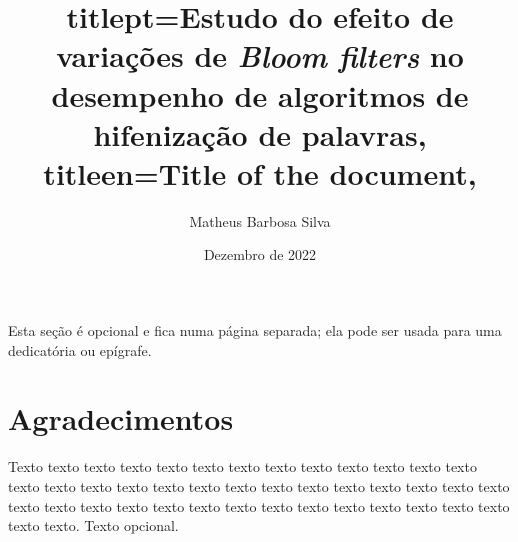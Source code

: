 \documentclass[12pt,twoside,english,brazilian]{book}
\title{
    titlept={Estudo do efeito de variações de \textit{Bloom filters} no desempenho de algoritmos de hifenização de palavras},
    titleen={Title of the document},
}
\author{Matheus Barbosa Silva}
\date{Dezembro de 2022}
\begin{document}

\frontmatter

\pagestyle{plain}

\onehalfspacing %

\maketitle %


\begin{dedicatoria}
Esta seção é opcional e fica numa página separada; ela pode ser usada para
uma dedicatória ou epígrafe.
\end{dedicatoria}


\chapter*{Agradecimentos}

Texto texto texto texto texto texto texto texto texto texto texto texto texto
texto texto texto texto texto texto texto texto texto texto texto texto texto
texto texto texto texto texto texto texto texto texto texto texto texto texto
texto texto texto texto. Texto opcional.




\end{document}
